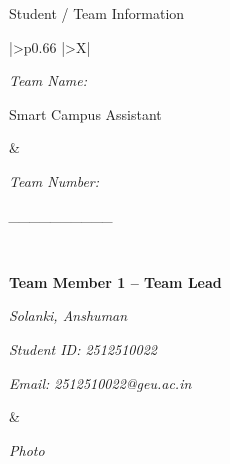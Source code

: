 \documentclass[11pt,a4paper]{article}
\newcommand{\blueheading}[1]{%
    \needspace{7\baselineskip}
    {\sffamily
    \color{TitleBlue}
    \fontsize{15}{18}
    \selectfont
    #1}%
}
\newenvironment{sectionblock}
{%
    \par
    \needspace{8\baselineskip}
}
{%
    \par
}
\begin{document}
\begin{sectionblock}

\blueheading{Student / Team Information}

\vspace{2mm}

\noindent
\begin{tabularx}{\textwidth}{
    |>{\RaggedRight\arraybackslash}p{0.66\textwidth}
    |>{\RaggedRight\arraybackslash}X|
}
\hline


\begin{minipage}[t]{\linewidth}
\vspace{2mm}

\textit{Team Name:}

Smart Campus Assistant

\vspace{2mm}
\end{minipage}
&
\begin{minipage}[t]{\linewidth}
\vspace{2mm}

\textit{Team Number:}

\textit{__________}

\vspace{2mm}
\end{minipage}
\\
\hline


\begin{minipage}[t]{\linewidth}
\vspace{2mm}

\textbf{Team Member 1 -- Team Lead}

\textit{Solanki, Anshuman}

\textit{Student ID: 2512510022}

\textit{Email: 2512510022@geu.ac.in}

\vspace{2mm}
\end{minipage}
&
\begin{minipage}[t]{\linewidth}
\vspace{2mm}

\begin{center}
\textit{Photo}

\vspace{2mm}


\end{center}
\end{minipage}
\end{tabularx}
\end{sectionblock}
\end{document}
